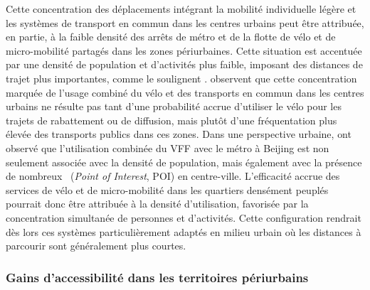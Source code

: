 \begin{refsegment}
Cette concentration des déplacements intégrant la mobilité individuelle légère et les systèmes de transport en commun dans les centres urbains peut être attribuée, en partie, à la faible densité des arrêts de métro et de la flotte de vélo et de micro-mobilité partagés dans les zones périurbaines. Cette situation est accentuée par une densité de population et d'activités plus faible, imposant des distances de trajet plus importantes, comme le soulignent \textcolor{blue}{\textcite[12]{liu_use_2020}}. \textcolor{blue}{\textcite[104]{wang_bicycle-transit_2013}} observent que cette concentration marquée de l'usage combiné du vélo et des transports en commun dans les centres urbains ne résulte pas tant d'une probabilité accrue d'utiliser le vélo pour les trajets de rabattement ou de diffusion, mais plutôt d'une fréquentation plus élevée des transports publics dans ces zones. Dans une perspective urbaine, \textcolor{blue}{\textcite[9]{li_exploring_2022}} ont observé que l'utilisation combinée du \acrshort{VFF} avec le métro à Beijing est non seulement associée avec la densité de population, mais également avec la présence de nombreux ~(\textsl{Point of Interest}, POI) en centre-ville. L'efficacité accrue des services de vélo et de micro-mobilité dans les quartiers densément peuplés pourrait donc être attribuée à la densité d'utilisation, favorisée par la concentration simultanée de personnes et d'activités. Cette configuration rendrait dès lors ces systèmes particulièrement adaptés en milieu urbain où les distances à parcourir sont généralement plus courtes.%
        
\subsubsection*{Gains d'accessibilité dans les territoires périurbains
    \label{chap2:gains-accessibilite-periurbain}
    }
    

\end{refsegment}
